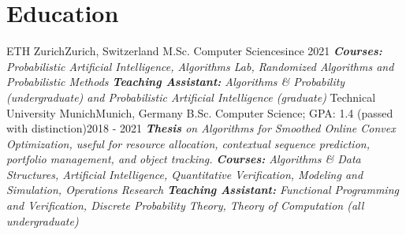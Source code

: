 \documentclass[a4paper,20pt]{article}
\begin{document}
\section{Education}
  \resumeSubHeadingListStart
    \resumeSubheading
      {ETH Zurich}{Zurich, Switzerland}
      {M.Sc. Computer Science}{since 2021}
      {\scriptsize \textit{ \footnotesize{\newline{}\textbf{Courses:} Probabilistic Artificial Intelligence, Algorithms Lab, Randomized Algorithms and Probabilistic Methods}
      \footnotesize{\newline{}\textbf{Teaching Assistant:} Algorithms \& Probability (undergraduate) and Probabilistic Artificial Intelligence (graduate)}}}
    \resumeSubHeadingListEnd
\vspace{-5pt}
  \resumeSubHeadingListStart
    \resumeSubheading
      {Technical University Munich}{Munich, Germany}
      {B.Sc. Computer Science; GPA: 1.4 (passed with distinction)}{2018 - 2021}
      {\scriptsize \textit{
      \footnotesize{\newline{}\textbf{Thesis} on Algorithms for Smoothed Online Convex Optimization, useful for resource allocation, contextual sequence prediction, portfolio management, and object tracking.} \footnotesize{\newline{}\textbf{Courses:} Algorithms \& Data Structures, Artificial Intelligence, Quantitative Verification, Modeling and Simulation, Operations Research}
      \footnotesize{\newline{}\textbf{Teaching Assistant:} Functional Programming and Verification, Discrete Probability Theory, Theory of Computation (all undergraduate)}}}
    \resumeSubHeadingListEnd

\vspace{-5pt}
\end{document}
